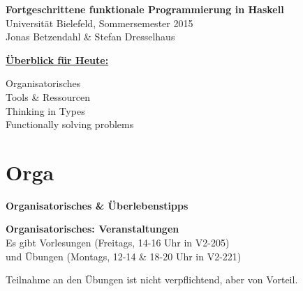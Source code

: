 \documentclass[unknownkeysallowed]{beamer}
\begin{document}
 
  

  \begin{frame}
  \begin{center}
    \huge\textbf{Fortgeschrittene funktionale Programmierung in Haskell}\\ \bigskip
    \LARGE Universität Bielefeld, Sommersemester 2015\\ \bigskip
    \large Jonas Betzendahl \& Stefan Dresselhaus
    \end{center}
  \end{frame}

  
\begin{frame}
\begin{center}
	\Large\textbf{\underline{Überblick für Heute:}}\\ \bigskip\bigskip\normalsize
	
	Organisatorisches\\\bigskip
	Tools \& Ressourcen\\\bigskip
	Thinking in Types\\\bigskip
	Functionally solving problems\\\bigskip
    \end{center}
\end{frame}

  \section{Orga}
  
  \begin{frame}

    \begin{center}
    \Large\textbf{Organisatorisches \& Überlebenstipps}
    \end{center}
  \end{frame}

  
  \begin{frame}
    \begin{center}
    \Large\textbf{Organisatorisches: Veranstaltungen}\\ \bigskip \normalsize
    Es gibt Vorlesungen (Freitags, 14-16 Uhr in V2-205)\\
    und Übungen (Montags, 12-14 \& 18-20 Uhr in V2-221)\bigskip
	
	Teilnahme an den Übungen ist nicht verpflichtend, aber von Vorteil.  
    \end{center}
  \end{frame}
  
\end{document}
